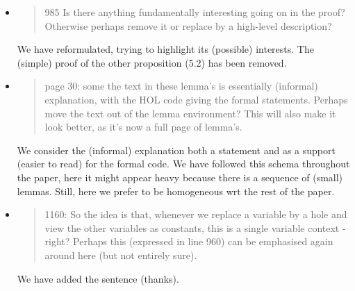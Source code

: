 \begin{itemize}
  \item \begin{quote}
985 Is there anything fundamentally interesting going on in the proof? Otherwise perhaps remove it or replace by a high-level description?
\end{quote}
  \Mark 
We have reformulated, trying to highlight its (possible)
interests. The (simple) proof of the other proposition (5.2) has been removed.



  \item \begin{quote}
page 30: some the text in these lemma's is essentially (informal) explanation, with the HOL code giving the formal statements. Perhaps move the text out of the lemma environment? This will also make it look better, as it's now a full page of lemma's. 
\end{quote}
  \Mark We consider the (informal) explanation both  a statement 
and  as a support (easier to read) for the formal code. 
We have followed this schema throughout the paper, here it might appear 
heavy because there is a sequence of (small) lemmas. 
Still, here we prefer to be homogeneous wrt the rest of the paper. 


  \item \begin{quote}
1160: So the idea is that, whenever we replace a variable by a hole and view the other variables as constants, this is a single variable context - right? Perhaps this (expressed in line 960) can be emphasised again around here (but not entirely sure). 
\end{quote}
  \Mark We have added the sentence (thanks).


\end{itemize}
